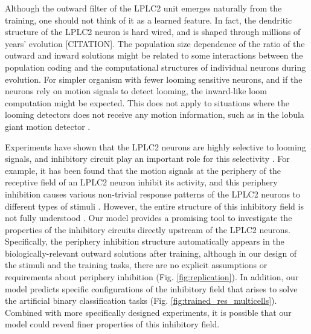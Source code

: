 \documentclass[pdftex,9pt,lineno]{elife}
\begin{document}
Although the outward filter of the LPLC2 unit emerges naturally from the training, one should not think of it as a learned feature. In fact, the dendritic structure of the LPLC2 neuron is hard wired, and is shaped through millions of years' evolution [CITATION]. The population size dependence of the ratio of the outward and inward solutions might be related to some interactions between the population coding and the computational structures of individual neurons during evolution. For simpler organism with fewer looming sensitive neurons, and if the neurons rely on motion signals to detect looming, the inward-like loom computation might be expected. This does not apply to situations where the looming detectors does not receive any motion information, such as in the lobula giant motion detector \citep{rind1996neural}.

Experiments have shown that the LPLC2 neurons are highly selective to looming signals, and inhibitory circuit play an important role for this selectivity \citep{klapoetke2017ultra}. For example, it has been found that the motion signals at the periphery of the receptive field of an LPLC2 neuron inhibit its activity, and this periphery inhibition causes various non-trivial response patterns of the LPLC2 neurons to different types of stimuli \citep{klapoetke2017ultra}. However, the entire structure of this inhibitory field is not fully understood \citep{klapoetke2017ultra}. Our model provides a promising tool to investigate the properties of the inhibitory circuits directly upstream of the LPLC2 neurons. Specifically, the periphery inhibition structure automatically appears in the biologically-relevant outward solutions after training, although in our design of the stimuli and the training tasks, there are no explicit assumptions or requirements about periphery inhibition (Fig. \ref{fig:replication}). In addition, our model predicts specific configurations of the inhibitory field that arises to solve the artificial binary classification tasks (Fig. \ref{fig:trained_res_multicells}). Combined with more specifically designed experiments, it is possible that our model could reveal finer properties of this inhibitory field.
\end{document}
